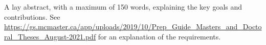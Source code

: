 A lay abstract, with a maximum of 150 words, explaining the key goals and
contributions. See
\url{https://gs.mcmaster.ca/app/uploads/2019/10/Prep_Guide_Masters_and_Doctoral_Theses_August-2021.pdf}
for an explanation of the requirements.

